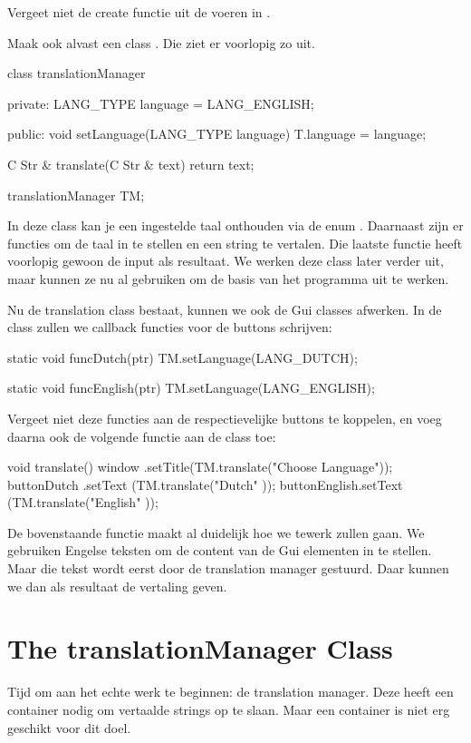 Vergeet niet de create functie uit de voeren in .

Maak ook alvast een class . Die ziet er voorlopig zo uit.

\begin{code}
class translationManager {
private:
	LANG_TYPE language = LANG_ENGLISH;

public:
	void setLanguage(LANG_TYPE language) {
		T.language = language;
	}	

	C Str & translate(C Str & text) {
		return text;
	}
}
translationManager TM;
\end{code}

In deze class kan je een ingestelde taal onthouden via de enum . Daarnaast zijn er functies om de taal in te stellen en een string te vertalen. Die laatste functie heeft voorlopig gewoon de input als resultaat. We werken deze class later verder uit, maar kunnen ze nu al gebruiken om de basis van het programma uit te werken.

Nu de translation class bestaat, kunnen we ook de Gui classes afwerken. In de class  zullen we callback functies voor de buttons schrijven:

\begin{code}
static void funcDutch(ptr)
{
  TM.setLanguage(LANG_DUTCH);
}

static void funcEnglish(ptr)
{
  TM.setLanguage(LANG_ENGLISH);
}
\end{code}

Vergeet niet deze functies aan de respectievelijke buttons te koppelen, en voeg daarna ook de volgende functie aan de class  toe:

\begin{code}
void translate()
{
  window       .setTitle(TM.translate("Choose Language"));
  buttonDutch  .setText (TM.translate("Dutch"          ));
  buttonEnglish.setText (TM.translate("English"        ));
}
\end{code}

De bovenstaande functie maakt al duidelijk hoe we tewerk zullen gaan. We gebruiken Engelse teksten om de content van de Gui elementen in te stellen. Maar die tekst wordt eerst door de translation manager gestuurd. Daar kunnen we dan als resultaat de vertaling geven.

\section{The translationManager Class}
Tijd om aan het echte werk te beginnen: de translation manager. Deze heeft een container nodig om vertaalde strings op te slaan. Maar een container is niet erg geschikt voor dit doel. 

